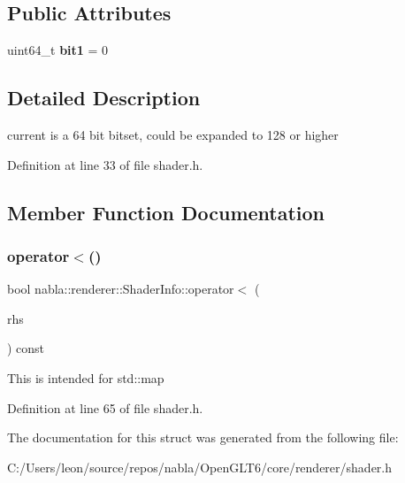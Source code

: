 \subsection*{Public Attributes}
\begin{DoxyCompactItemize}
\item 
\mbox{\label{structnabla_1_1renderer_1_1_shader_info_ad3f01b754f920d46a4d814e97bc2e050}} 
uint64\+\_\+t {\bfseries bit1} = 0
\end{DoxyCompactItemize}


\subsection{Detailed Description}
current is a 64 bit bitset, could be expanded to 128 or higher 

Definition at line 33 of file shader.\+h.



\subsection{Member Function Documentation}
\mbox{\label{structnabla_1_1renderer_1_1_shader_info_abff5bebbb55efb91846b6580f194d67d}} 
\subsubsection{\texorpdfstring{operator$<$()}{operator<()}}
{\footnotesize\ttfamily bool nabla\+::renderer\+::\+Shader\+Info\+::operator$<$ (\begin{DoxyParamCaption}\item[{const \mbox{\hyperlink{structnabla_1_1renderer_1_1_shader_info}{Shader\+Info}} \&}]{rhs }\end{DoxyParamCaption}) const\hspace{0.3cm}{\ttfamily [inline]}}

This is intended for std\+::map 

Definition at line 65 of file shader.\+h.



The documentation for this struct was generated from the following file\+:\begin{DoxyCompactItemize}
\item 
C\+:/\+Users/leon/source/repos/nabla/\+Open\+G\+L\+T6/core/renderer/shader.\+h\end{DoxyCompactItemize}
